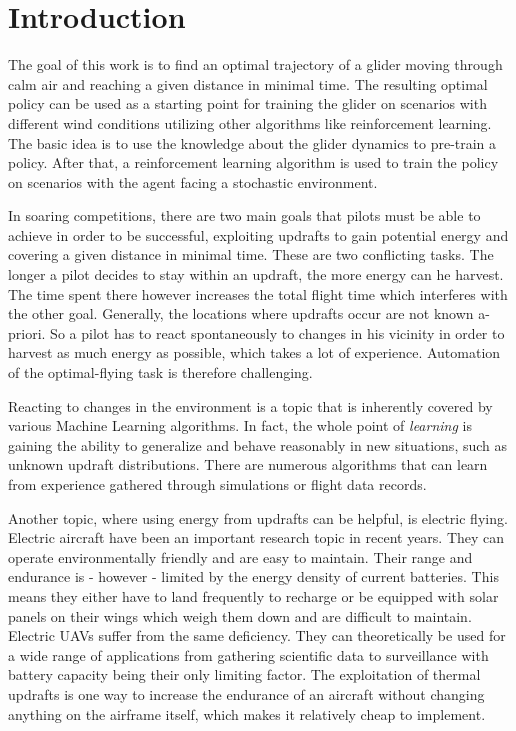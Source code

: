 
\chapter{Introduction}

The goal of this work is to find an optimal trajectory of a glider moving through calm air and reaching a given distance in minimal time. The resulting optimal policy can be used as a starting point for training the glider on scenarios with different wind conditions utilizing other algorithms like reinforcement learning. The basic idea is to use the knowledge about the glider dynamics to pre-train a policy. After that, a reinforcement learning algorithm is used to train the policy on scenarios with the agent facing a stochastic environment.

In soaring competitions, there are two main goals that pilots must be able to achieve in order to be successful, exploiting updrafts to gain potential energy and covering a given distance in minimal time. These are two conflicting tasks. The longer a pilot decides to stay within an updraft, the more energy can he harvest. The time spent there however increases the total flight time which interferes with the other goal. Generally, the locations where updrafts occur are not known a-priori. So a pilot has to react spontaneously to changes in his vicinity in order to harvest as much energy as possible, which takes a lot of experience. Automation of the optimal-flying task is therefore challenging.

Reacting to changes in the environment is a topic that is inherently covered by various Machine Learning algorithms. In fact, the whole point of \textit{learning} is gaining the ability to generalize and behave reasonably in new situations, such as unknown updraft distributions. There are numerous algorithms that can learn from experience gathered through simulations or flight data records.

Another topic, where using energy from updrafts can be helpful, is electric flying. Electric aircraft have been an important research topic in recent years. They can operate environmentally friendly and are easy to maintain. Their range and endurance is - however - limited by the energy density of current batteries. This means they either have to land frequently to recharge or be equipped with solar panels on their wings which weigh them down and are difficult to maintain. Electric UAVs suffer from the same deficiency. They can theoretically be used for a wide range of applications from gathering scientific data to surveillance with battery capacity being their only limiting factor. The exploitation of thermal updrafts is one way to increase the endurance of an aircraft without changing anything on the airframe itself, which makes it relatively cheap to implement.

